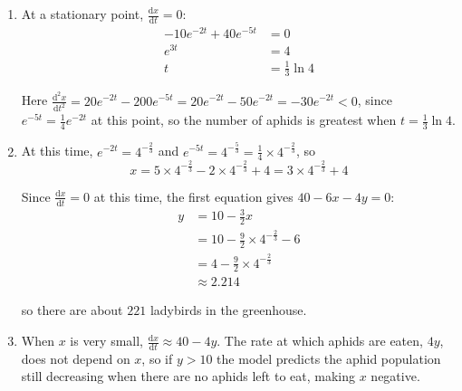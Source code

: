 \documentclass[leqno]{article}
\begin{document}
\begin{enumerate}[
  label=\textbf{\arabic*.},
  leftmargin=*,
  topsep=0pt,
  partopsep=0pt,
  parsep=0pt
]
\begin{djsSolution}
\begin{enumerate}[label=\textbf{(\alph*)}, start=1]
  \item At a stationary point, \(\frac{\mathrm{d}x}{\mathrm{d}t} = 0\):
  \begin{align*}
  -10e^{-2t} + 40e^{-5t} &= 0 \\
  e^{3t} &= 4 \\
  t &= \frac{1}{3}\ln 4
  \end{align*}

  Here \(\frac{\mathrm{d}^2x}{\mathrm{d}t^2} = 20e^{-2t} - 200e^{-5t} = 20e^{-2t} - 50e^{-2t} = -30e^{-2t} < 0\), since \(e^{-5t} = \frac{1}{4}e^{-2t}\) at this point, so the number of aphids is greatest when \(t = \frac{1}{3}\ln 4\).

  \item At this time, \(e^{-2t} = 4^{-\frac{2}{3}}\) and \(e^{-5t} = 4^{-\frac{5}{3}} = \frac{1}{4}\times 4^{-\frac{2}{3}}\), so
  \[
  x = 5\times 4^{-\frac{2}{3}} - 2\times 4^{-\frac{2}{3}} + 4 = 3\times 4^{-\frac{2}{3}} + 4
  \]

  Since \(\frac{\mathrm{d}x}{\mathrm{d}t} = 0\) at this time, the first equation gives \(40 - 6x - 4y = 0\):
  \begin{align*}
  y &= 10 - \frac{3}{2}x \\
  &= 10 - \frac{9}{2}\times 4^{-\frac{2}{3}} - 6 \\
  &= 4 - \frac{9}{2}\times 4^{-\frac{2}{3}} \\
  &\approx 2.214
  \end{align*}

  so there are about \(221\) ladybirds in the greenhouse.

  \item When \(x\) is very small, \(\frac{\mathrm{d}x}{\mathrm{d}t} \approx 40 - 4y\). The rate at which aphids are eaten, \(4y\), does not depend on \(x\), so if \(y > 10\) the model predicts the aphid population still decreasing when there are no aphids left to eat, making \(x\) negative.
\end{enumerate}
\end{djsSolution}


\newpage

\questionitem


\end{enumerate}
\end{document}
